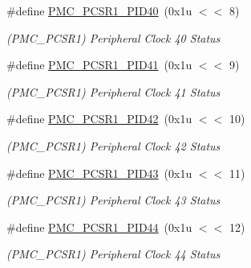 \begin{DoxyCompactItemize}
\mbox{\label{group__SAME70__PMC_gabc733017d6d15847ef4a5923cd440bee}} 
\#define \mbox{\hyperlink{group__SAME70__PMC_gabc733017d6d15847ef4a5923cd440bee}{P\+M\+C\+\_\+\+P\+C\+S\+R1\+\_\+\+P\+I\+D40}}~(0x1u $<$$<$ 8)
\begin{DoxyCompactList}\small\item\em (P\+M\+C\+\_\+\+P\+C\+S\+R1) Peripheral Clock 40 Status \end{DoxyCompactList}\item 
\mbox{\label{group__SAME70__PMC_gab818df8c851c2004e980467587acc827}} 
\#define \mbox{\hyperlink{group__SAME70__PMC_gab818df8c851c2004e980467587acc827}{P\+M\+C\+\_\+\+P\+C\+S\+R1\+\_\+\+P\+I\+D41}}~(0x1u $<$$<$ 9)
\begin{DoxyCompactList}\small\item\em (P\+M\+C\+\_\+\+P\+C\+S\+R1) Peripheral Clock 41 Status \end{DoxyCompactList}\item 
\mbox{\label{group__SAME70__PMC_gaa9dabc6093c0bf2f44a76f602881e210}} 
\#define \mbox{\hyperlink{group__SAME70__PMC_gaa9dabc6093c0bf2f44a76f602881e210}{P\+M\+C\+\_\+\+P\+C\+S\+R1\+\_\+\+P\+I\+D42}}~(0x1u $<$$<$ 10)
\begin{DoxyCompactList}\small\item\em (P\+M\+C\+\_\+\+P\+C\+S\+R1) Peripheral Clock 42 Status \end{DoxyCompactList}\item 
\mbox{\label{group__SAME70__PMC_ga373fe9910cd34f16ddfe94f47b70b156}} 
\#define \mbox{\hyperlink{group__SAME70__PMC_ga373fe9910cd34f16ddfe94f47b70b156}{P\+M\+C\+\_\+\+P\+C\+S\+R1\+\_\+\+P\+I\+D43}}~(0x1u $<$$<$ 11)
\begin{DoxyCompactList}\small\item\em (P\+M\+C\+\_\+\+P\+C\+S\+R1) Peripheral Clock 43 Status \end{DoxyCompactList}\item 
\mbox{\label{group__SAME70__PMC_ga39088bffa9395fcc9a36b177be66f004}} 
\#define \mbox{\hyperlink{group__SAME70__PMC_ga39088bffa9395fcc9a36b177be66f004}{P\+M\+C\+\_\+\+P\+C\+S\+R1\+\_\+\+P\+I\+D44}}~(0x1u $<$$<$ 12)
\begin{DoxyCompactList}\small\item\em (P\+M\+C\+\_\+\+P\+C\+S\+R1) Peripheral Clock 44 Status \end{DoxyCompactList}\item 
$$
\end{DoxyCompactItemize}

